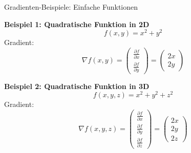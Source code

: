 \documentclass{beamer}
\begin{document}
    \begin{frame}{Gradienten-Beispiele: Einfache Funktionen}
    
        \textbf{Beispiel 1: Quadratische Funktion in 2D}
        \[
        f(x, y) = x^2 + y^2
        \]
        Gradient:
        \[
        \nabla f(x, y) = 
        \begin{pmatrix}
        \frac{\partial f}{\partial x} \\
        \frac{\partial f}{\partial y}
        \end{pmatrix}
        = 
        \begin{pmatrix}
        2x \\
        2y
        \end{pmatrix}
        \]
        
        \textbf{Beispiel 2: Quadratische Funktion in 3D}
        \[
        f(x, y, z) = x^2 + y^2 + z^2
        \]
        Gradient:
        \[
        \nabla f(x, y, z) = 
        \begin{pmatrix}
        \frac{\partial f}{\partial x} \\
        \frac{\partial f}{\partial y} \\
        \frac{\partial f}{\partial z}
        \end{pmatrix}
        = 
        \begin{pmatrix}
        2x \\
        2y \\
        2z
        \end{pmatrix}
        \]
        
        \end{frame}
        
\end{document}
